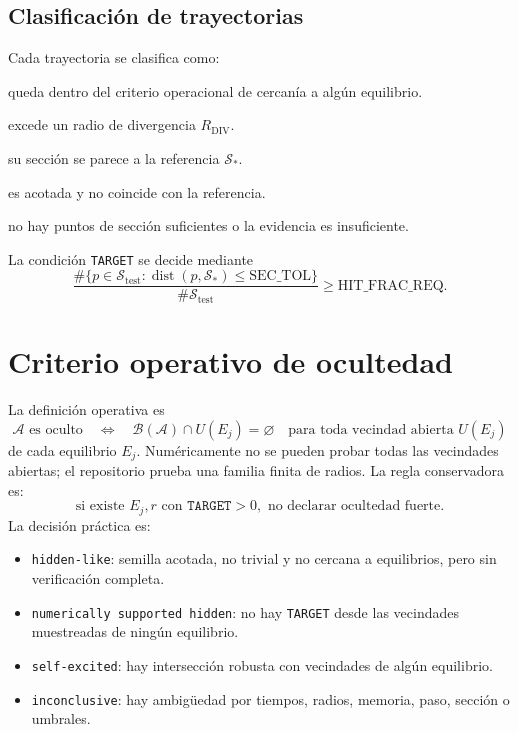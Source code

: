 \documentclass[11pt]{article}
\begin{document}
\subsection{Clasificación de trayectorias}

Cada trayectoria se clasifica como:
\begin{description}[leftmargin=3.0cm]
\item[\texttt{EQ}] queda dentro del criterio operacional de cercanía a algún equilibrio.
\item[\texttt{DIV}] excede un radio de divergencia \(R_{\mathrm{DIV}}\).
\item[\texttt{TARGET}] su sección se parece a la referencia \(\mathcal S_*\).
\item[\texttt{OTHER}] es acotada y no coincide con la referencia.
\item[\texttt{UNKNOWN}] no hay puntos de sección suficientes o la evidencia es insuficiente.
\end{description}

La condición \texttt{TARGET} se decide mediante
\begin{equation}
\frac{\#\{p\in\mathcal S_{\mathrm{test}}:\operatorname{dist}(p,\mathcal S_*)\leq \mathrm{SEC\_TOL}\}}
{\#\mathcal S_{\mathrm{test}}}
\geq \mathrm{HIT\_FRAC\_REQ}.
\label{eq:target_fraction}
\end{equation}

\section{Criterio operativo de ocultedad}

La definición operativa es
\begin{equation}
\mathcal A \text{ es oculto}
\quad\Longleftrightarrow\quad
\mathcal B(\mathcal A)\cap U(E_j)=\varnothing
\quad\text{para toda vecindad abierta }U(E_j)
\end{equation}
de cada equilibrio \(E_j\). Numéricamente no se pueden probar todas las vecindades abiertas; el repositorio prueba una familia finita de radios. La regla conservadora es:
\begin{equation}
\text{si existe }E_j,r\text{ con }\texttt{TARGET}>0,
\text{ no declarar ocultedad fuerte.}
\end{equation}
La decisión práctica es:
\begin{itemize}
\item \texttt{hidden-like}: semilla acotada, no trivial y no cercana a equilibrios, pero sin verificación completa.
\item \texttt{numerically supported hidden}: no hay \texttt{TARGET} desde las vecindades muestreadas de ningún equilibrio.
\item \texttt{self-excited}: hay intersección robusta con vecindades de algún equilibrio.
\item \texttt{inconclusive}: hay ambigüedad por tiempos, radios, memoria, paso, sección o umbrales.
\end{itemize}
\end{document}
